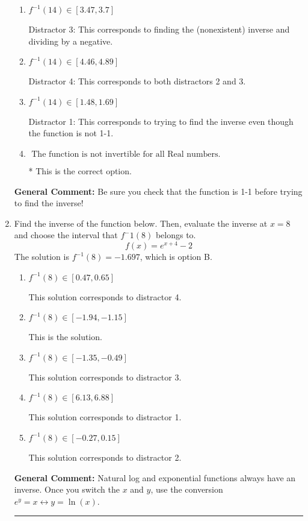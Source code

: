 \documentclass{extbook}[14pt]
\newcommand{\litem}[1]{\item #1

\rule{\textwidth}{0.4pt}}
\begin{document}
\begin{enumerate}
{\begin{enumerate}[label=\Alph*.]
 Distractor 2: This corresponds to finding the (nonexistent) inverse and not subtracting by the vertical shift.
\item \( f^{-1}(14) \in [3.47, 3.7] \)

 Distractor 3: This corresponds to finding the (nonexistent) inverse and dividing by a negative.
\item \( f^{-1}(14) \in [4.46, 4.89] \)

 Distractor 4: This corresponds to both distractors 2 and 3.
\item \( f^{-1}(14) \in [1.48, 1.69] \)

 Distractor 1: This corresponds to trying to find the inverse even though the function is not 1-1. 
\item \( \text{ The function is not invertible for all Real numbers. } \)

* This is the correct option.
\end{enumerate}

\textbf{General Comment:} Be sure you check that the function is 1-1 before trying to find the inverse!
}
\litem{
Find the inverse of the function below. Then, evaluate the inverse at $x = 8$ and choose the interval that $f^-1(8)$ belongs to.
\[ f(x) = e^{x+4}-2 \]The solution is \( f^{-1}(8) = -1.697 \), which is option B.\begin{enumerate}[label=\Alph*.]
\item \( f^{-1}(8) \in [0.47, 0.65] \)

 This solution corresponds to distractor 4.
\item \( f^{-1}(8) \in [-1.94, -1.15] \)

 This is the solution.
\item \( f^{-1}(8) \in [-1.35, -0.49] \)

 This solution corresponds to distractor 3.
\item \( f^{-1}(8) \in [6.13, 6.88] \)

 This solution corresponds to distractor 1.
\item \( f^{-1}(8) \in [-0.27, 0.15] \)

 This solution corresponds to distractor 2.
\end{enumerate}

\textbf{General Comment:} Natural log and exponential functions always have an inverse. Once you switch the $x$ and $y$, use the conversion $ e^y = x \leftrightarrow y=\ln(x)$.
}
\end{enumerate}
\end{document}

